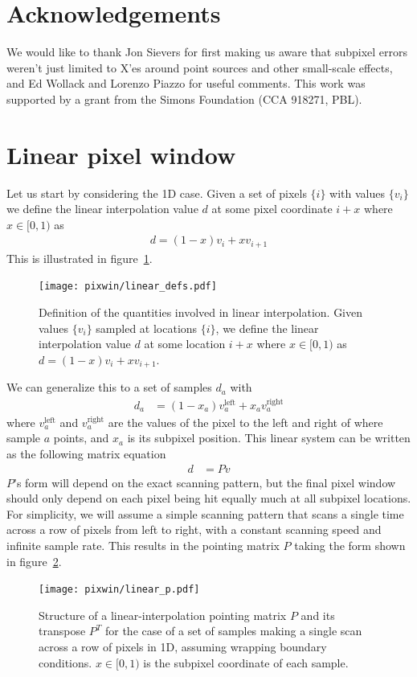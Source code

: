 \documentclass[twocolumn,apj]{aastex63}
\begin{document}
\section*{Acknowledgements}
We would like to thank Jon Sievers for first making us aware
that subpixel errors weren't just limited to X'es around point
sources and other small-scale effects, and Ed Wollack and Lorenzo Piazzo for useful comments.
This work was supported by a grant from the Simons Foundation (CCA 918271, PBL).




\clearpage

\appendix

\section{Linear pixel window}
\label{sec:linwin}
Let us start by considering the 1D case. Given a set of pixels $\{i\}$ with values $\{v_i\}$
we define the linear interpolation value $d$ at some pixel coordinate $i+x$ where $x\in[0,1)$ as
\begin{align}
	d = (1-x)v_i + x v_{i+1}
\end{align}
This is illustrated in figure~\ref{fig:linear-defs}.
\begin{figure}[h]
	\center
	\texttt{[image: pixwin/linear\_defs.pdf]}
	\caption{Definition of the quantities involved in linear interpolation.
	Given values $\{v_i\}$ sampled at locations $\{i\}$, we define the linear interpolation
	value $d$ at some location $i+x$ where $x\in[0,1)$ as $d = (1-x)v_i + x v_{i+1}$.}
	\label{fig:linear-defs}
\end{figure}

We can generalize this to a set of samples $d_a$ with
\begin{align}
	d_a &= (1-x_a) v_a^\text{left} + x_a v_a^\text{right}
\end{align}
where $v_a^\text{left}$ and $v_a^\text{right}$ are the values of the pixel to the left and right
of where sample $a$ points, and $x_a$ is its subpixel position. This linear system can be written
as the following matrix equation
\begin{align}
	d &= P v
\end{align}
$P$'s form will depend on the exact scanning pattern, but the final pixel window should only depend
on each pixel being hit equally much at all subpixel locations. For simplicity, we will assume a simple
scanning pattern that scans a single time across a row of pixels from left to right, with a constant
scanning speed and infinite sample rate. This results in the pointing matrix $P$ taking the form
shown in figure~\ref{fig:linear-p}.
\begin{figure}[h]
	\center
	\texttt{[image: pixwin/linear\_p.pdf]}
	\caption{Structure of a linear-interpolation pointing matrix $P$ and its transpose $P^T$
	for the case of a set of samples making a single scan across a row of pixels in 1D, assuming
	wrapping boundary conditions. $x \in [0,1)$ is the subpixel coordinate of each sample.}
	\label{fig:linear-p}
\end{figure}
\end{document}
